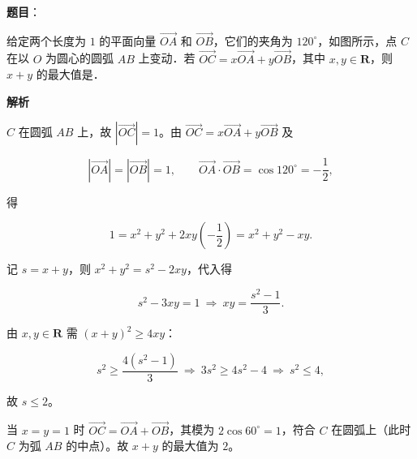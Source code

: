 \begin{answer}

\textbf{题目}：

给定两个长度为 $1$ 的平面向量 $\overrightarrow{OA}$ 和 $\overrightarrow{OB}$，它们的夹角为 $120^\circ$，如图所示，点 $C$ 在以 $O$ 为圆心的圆弧 $AB$ 上变动．若 $\overrightarrow{OC}=x\overrightarrow{OA}+y\overrightarrow{OB}$，其中 $x,y\in\mathbf R$，则 $x+y$ 的最大值是\gkblank{}．
\nopagebreak[4]
\begin{center}\end{center}
\nopagebreak[4]
\textbf{解析}

$C$ 在圆弧 $AB$ 上，故 $|\overrightarrow{OC}|=1$。由 $\overrightarrow{OC}=x\overrightarrow{OA}+y\overrightarrow{OB}$ 及

\nopagebreak[4]
\[|\overrightarrow{OA}|=|\overrightarrow{OB}|=1,\qquad
\overrightarrow{OA}\cdot\overrightarrow{OB}=\cos120^\circ=-\frac12,\]

得

\nopagebreak[4]
\[1=x^2+y^2+2xy\left(-\frac12\right)=x^2+y^2-xy .\]

记 $s=x+y$，则 $x^2+y^2=s^2-2xy$，代入得

\nopagebreak[4]
\[s^2-3xy=1\ \Longrightarrow\ xy=\frac{s^2-1}{3}.\]

由 $x,y\in\mathbf R$ 需 $(x+y)^2\geqslant4xy$：

\nopagebreak[4]
\[s^2\geqslant\frac{4(s^2-1)}{3}\ \Longrightarrow\ 3s^2\geqslant4s^2-4\ \Longrightarrow\ s^2\leqslant4,\]

故 $s\leqslant2$。

当 $x=y=1$ 时 $\overrightarrow{OC}=\overrightarrow{OA}+\overrightarrow{OB}$，其模为 $2\cos60^\circ=1$，符合 $C$ 在圆弧上（此时 $C$ 为弧 $AB$ 的中点）。故 $x+y$ 的最大值为 $2$。


\end{answer}
